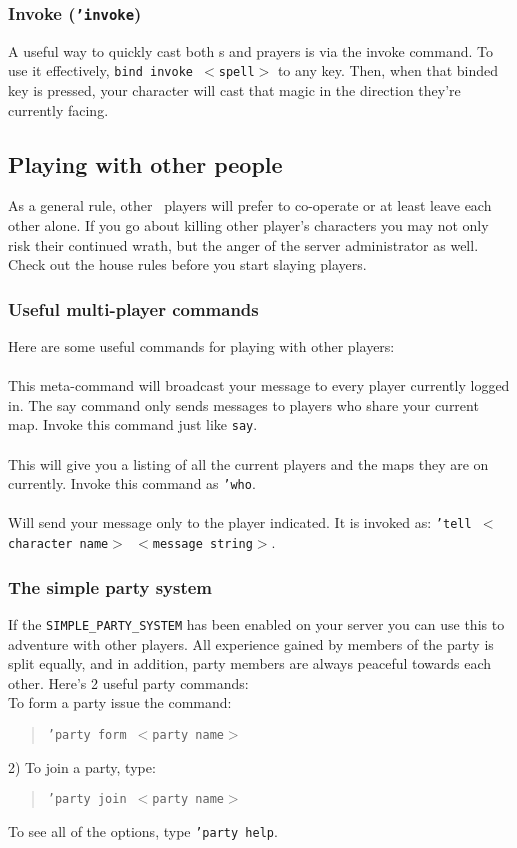 \subsubsection{Invoke ({\tt 'invoke})} 
A useful way to quickly cast both \incantation s and prayers is via the invoke
command. To use it effectively, {\tt bind invoke $<$spell$>$} to any
key. Then, when that binded key is pressed, your character will cast that magic
in the direction they're currently facing.

\subsection{Playing with other people}

As a general rule, other \cf\ players will prefer to co-operate or
at least leave each other alone. If you go about killing other player's
characters you may not only risk their continued wrath, but the anger of
the server administrator as well. Check out the house rules before you
start slaying players.

\subsubsection{Useful multi-player commands}

Here are some useful commands for playing with other players: \\

 \\
This meta-command will broadcast your message to every player currently
logged in. The say command only sends messages to players who share your
current map. Invoke this command just like {\tt say}.\\

 \\
This will give you a listing of all the current players and the maps
they are on currently. Invoke this command as {\tt 'who}.\\

 \\
Will send your message only to the player indicated. It is invoked as:
{\tt 'tell $<$character name$>$ $<$message string$>$}.\\

\subsubsection{The simple party system}
If the {\tt SIMPLE\_PARTY\_SYSTEM} has been enabled on your server you can
use this to adventure with other players. All experience gained by
members of the party is split equally, and in addition, party members
are always peaceful towards each other. Here's 2 useful party commands:\\

 To form a party issue the command:
\begin{quote}
{\tt 'party form $<$party name$>$ }
\end{quote}
2) To join a party, type:
\begin{quote}
{\tt 'party join $<$party name$>$ }
\end{quote}
To see all of the options, type {\tt 'party help}.


